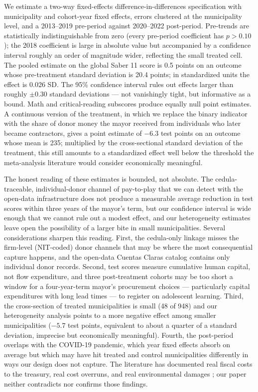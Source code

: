 \documentclass[12pt]{article}
\begin{document}
We estimate a two-way fixed-effects difference-in-differences specification with municipality and cohort-year fixed effects, errors clustered at the municipality level, and a 2013--2019 pre-period against 2020--2022 post-period. Pre-trends are statistically indistinguishable from zero (every pre-period coefficient has $p > 0.10$); the 2018 coefficient is large in absolute value but accompanied by a confidence interval roughly an order of magnitude wider, reflecting the small treated cell. The pooled estimate on the global Saber 11 score is 0.5 points on an outcome whose pre-treatment standard deviation is 20.4 points; in standardized units the effect is 0.026 SD. The 95\% confidence interval rules out effects larger than roughly $\pm 0.30$ standard deviations --- not vanishingly tight, but informative as a bound. Math and critical-reading subscores produce equally null point estimates. A continuous version of the treatment, in which we replace the binary indicator with the share of donor money the mayor received from individuals who later became contractors, gives a point estimate of $-6.3$ test points on an outcome whose mean is 235; multiplied by the cross-sectional standard deviation of the treatment, this still amounts to a standardized effect well below the threshold the meta-analysis literature would consider economically meaningful.

The honest reading of these estimates is bounded, not absolute. The cedula-traceable, individual-donor channel of pay-to-play that we can detect with the open-data infrastructure does not produce a measurable average reduction in test scores within three years of the mayor's term, but our confidence interval is wide enough that we cannot rule out a modest effect, and our heterogeneity estimates leave open the possibility of a larger bite in small municipalities. Several considerations sharpen this reading. First, the cedula-only linkage misses the firm-level (NIT-coded) donor channels that may be where the most consequential capture happens, and the open-data Cuentas Claras catalog contains only individual donor records. Second, test scores measure cumulative human capital, not flow expenditure, and three post-treatment cohorts may be too short a window for a four-year-term mayor's procurement choices --- particularly capital expenditures with long lead times --- to register on adolescent learning. Third, the cross-section of treated municipalities is small (48 of 948) and our heterogeneity analysis points to a more negative effect among smaller municipalities ($-5.7$ test points, equivalent to about a quarter of a standard deviation, imprecise but economically meaningful). Fourth, the post-period overlaps with the COVID-19 pandemic, which year fixed effects absorb on average but which may have hit treated and control municipalities differently in ways our design does not capture. The literature has documented real fiscal costs to the treasury, real cost overruns, and real environmental damages \citep{gulzar2022contracts,riano2024donors,paschke2024deforestation}; our paper neither contradicts nor confirms those findings.
\end{document}
